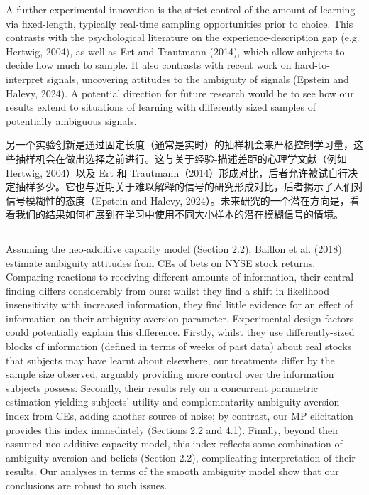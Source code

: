 \documentclass[12pt,a4paper]{article}
\newenvironment{original}
  {\par\vspace{0.5em}\noindent\color{black}\ignorespaces}
  {\par\vspace{0.3em}}
\newenvironment{translation}
  {\par\noindent\color{transblue}\ignorespaces}
  {\par\vspace{0.8em}\hrule\vspace{0.5em}}
\begin{document}
\begin{original}
A further experimental innovation is the strict control of the amount of learning via fixed-length, typically real-time sampling opportunities prior to choice. This contrasts with the psychological literature on the experience-description gap (e.g. Hertwig, 2004), as well as Ert and Trautmann (2014), which allow subjects to decide how much to sample. It also contrasts with recent work on hard-to-interpret signals, uncovering attitudes to the ambiguity of signals (Epstein and Halevy, 2024). A potential direction for future research would be to see how our results extend to situations of learning with differently sized samples of potentially ambiguous signals.
\end{original}

\begin{translation}
另一个实验创新是通过固定长度（通常是实时）的抽样机会来严格控制学习量，这些抽样机会在做出选择之前进行。这与关于经验-描述差距的心理学文献（例如 Hertwig, 2004）以及 Ert 和 Trautmann（2014）形成对比，后者允许被试自行决定抽样多少。它也与近期关于难以解释的信号的研究形成对比，后者揭示了人们对信号模糊性的态度（Epstein and Halevy, 2024）。未来研究的一个潜在方向是，看看我们的结果如何扩展到在学习中使用不同大小样本的潜在模糊信号的情境。
\end{translation}

\begin{original}
Assuming the neo-additive capacity model (Section 2.2), Baillon et al. (2018) estimate ambiguity attitudes from CEs of bets on NYSE stock returns. Comparing reactions to receiving different amounts of information, their central finding differs considerably from ours: whilst they find a shift in likelihood insensitivity with increased information, they find little evidence for an effect of information on their ambiguity aversion parameter. Experimental design factors could potentially explain this difference. Firstly, whilst they use differently-sized blocks of information (defined in terms of weeks of past data) about real stocks that subjects may have learnt about elsewhere, our treatments differ by the sample size observed, arguably providing more control over the information subjects possess. Secondly, their results rely on a concurrent parametric estimation yielding subjects' utility and complementarity ambiguity aversion index from CEs, adding another source of noise; by contrast, our MP elicitation provides this index immediately (Sections 2.2 and 4.1). Finally, beyond their assumed neo-additive capacity model, this index reflects some combination of ambiguity aversion and beliefs (Section 2.2), complicating interpretation of their results. Our analyses in terms of the smooth ambiguity model show that our conclusions are robust to such issues.
\end{original}
\end{document}
